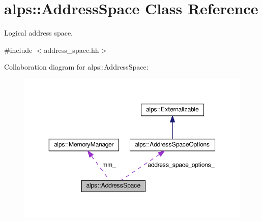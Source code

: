 \hypertarget{classalps_1_1AddressSpace}{}\section{alps\+:\+:Address\+Space Class Reference}
\label{classalps_1_1AddressSpace}


Logical address space.  




{\ttfamily \#include $<$address\+\_\+space.\+hh$>$}



Collaboration diagram for alps\+:\+:Address\+Space\+:
\nopagebreak
\begin{figure}[H]
\begin{center}
\leavevmode
\includegraphics[width=350pt]{classalps_1_1AddressSpace__coll__graph}
\end{center}
\end{figure}
